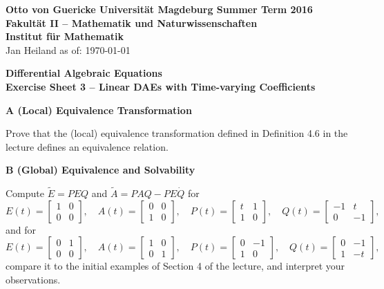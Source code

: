 \documentclass[a4paper,10pt]{article}
\begin{document}
{\bf Otto von Guericke Universit{\"a}t Magdeburg \hfill Summer Term 2016} \\
{\bf Fakult\"at II -- Mathematik und Naturwissenschaften} \\
{\bf Institut f\"ur Mathematik} \\
Jan Heiland \hfill as of: \today \\


\bigskip
\begin{center}
\textbf{\large Differential Algebraic Equations}\\
\smallskip
\textbf{Exercise Sheet 3 -- Linear DAEs with Time-varying Coefficients}\\
\end{center}

\bigskip


{\bf A (Local) Equivalence Transformation}

Prove that the (local) equivalence transformation defined in Definition 4.6 in the lecture defines an equivalence relation.
\smallskip

{\bf B (Global) Equivalence and Solvability}

Compute $\tilde E = PEQ$ and $\tilde A = PAQ - PE\dot Q$ for 
\begin{equation*}
	E(t) = \begin{bmatrix} 1 &0 \\ 0 &0 \end{bmatrix} ,\quad
	A(t) = \begin{bmatrix} 0 &0 \\ 1 &0 \end{bmatrix} ,\quad
	P(t) = \begin{bmatrix} t &1 \\ 1 &0 \end{bmatrix} ,\quad
	Q(t) = \begin{bmatrix} -1 &t \\ 0 &-1 \end{bmatrix} ,
\end{equation*}
and for
\begin{equation*}
	E(t) = \begin{bmatrix} 0 &1 \\ 0 &0 \end{bmatrix} ,\quad
	A(t) = \begin{bmatrix} 1 &0 \\ 0 &1 \end{bmatrix} ,\quad
	P(t) = \begin{bmatrix} 0 &-1 \\ 1 &0 \end{bmatrix} ,\quad
	Q(t) = \begin{bmatrix} 0 &-1 \\ 1 &-t \end{bmatrix} ,
\end{equation*}
compare it to the initial examples of Section 4 of the lecture, and interpret your observations.
\smallskip
\end{document}
